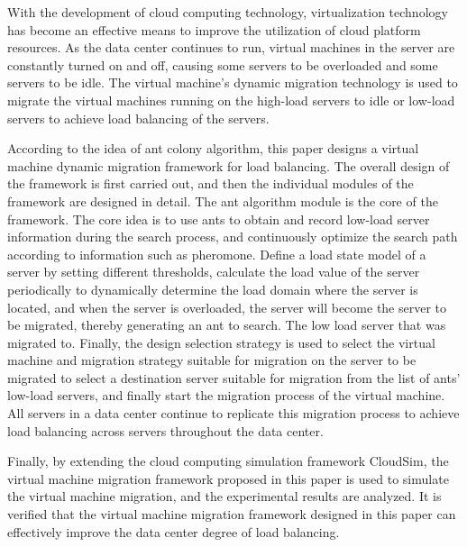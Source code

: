 \begin{enabstract}
With the development of cloud computing technology, virtualization technology has become an effective means to improve the utilization of cloud platform resources. As the data center continues to run, virtual machines in the server are constantly turned on and off, causing some servers to be overloaded and some servers to be idle. The virtual machine's dynamic migration technology is used to migrate the virtual machines running on the high-load servers to idle or low-load servers to achieve load balancing of the servers.

According to the idea of ​​ant colony algorithm, this paper designs a virtual machine dynamic migration framework for load balancing. The overall design of the framework is first carried out, and then the individual modules of the framework are designed in detail. The ant algorithm module is the core of the framework. The core idea is to use ants to obtain and record low-load server information during the search process, and continuously optimize the search path according to information such as pheromone. Define a load state model of a server by setting different thresholds, calculate the load value of the server periodically to dynamically determine the load domain where the server is located, and when the server is overloaded, the server will become the server to be migrated, thereby generating an ant to search. The low load server that was migrated to. Finally, the design selection strategy is used to select the virtual machine and migration strategy suitable for migration on the server to be migrated to select a destination server suitable for migration from the list of ants' low-load servers, and finally start the migration process of the virtual machine. All servers in a data center continue to replicate this migration process to achieve load balancing across servers throughout the data center.

Finally, by extending the cloud computing simulation framework CloudSim, the virtual machine migration framework proposed in this paper is used to simulate the virtual machine migration, and the experimental results are analyzed. It is verified that the virtual machine migration framework designed in this paper can effectively improve the data center degree of load balancing.

\end{enabstract}
